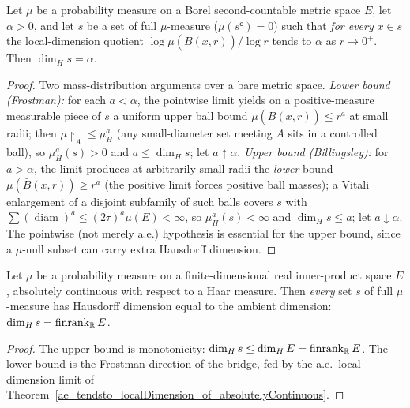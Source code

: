 \begin{theorem}\label{dimH_eq_of_localDimension_eq}
  \leanok
  Let \(\mu\) be a probability measure on a Borel second-countable metric space \(E\), let
  \(\alpha > 0\), and let \(s\) be a set of full \(\mu\)-measure (\(\mu(s^{\mathsf c}) = 0\)) such
  that \emph{for every} \(x \in s\) the local-dimension quotient
  \(\log \mu(\bar B(x,r))/\log r\) tends to \(\alpha\) as \(r \to 0^+\). Then
  \(\dim_H s = \alpha\).
\end{theorem}
\begin{proof}\leanok
  Two mass-distribution arguments over a bare metric space. \emph{Lower bound (Frostman):} for
  each \(a < \alpha\), the pointwise limit yields on a positive-measure measurable piece of \(s\)
  a uniform upper ball bound \(\mu(\bar B(x,r)) \le r^a\) at small radii; then
  \(\mu\!\restriction_A \le \mu_H^a\) (any small-diameter set meeting \(A\) sits in a controlled
  ball), so \(\mu_H^a(s) > 0\) and \(a \le \dim_H s\); let \(a \uparrow \alpha\). \emph{Upper
  bound (Billingsley):} for \(a > \alpha\), the limit produces at arbitrarily small radii the
  \emph{lower} bound \(\mu(\bar B(x,r)) \ge r^a\) (the positive limit forces positive ball
  masses); a Vitali enlargement of a disjoint subfamily of such balls covers \(s\) with
  \(\sum (\operatorname{diam})^a \le (2\tau)^a \mu(E) < \infty\), so \(\mu_H^a(s) < \infty\) and
  \(\dim_H s \le a\); let \(a \downarrow \alpha\). The pointwise (not merely a.e.) hypothesis is
  essential for the upper bound, since a \(\mu\)-null subset can carry extra Hausdorff dimension.
\end{proof}

\begin{theorem}\label{dimH_eq_finrank_of_ae_full_of_absolutelyContinuous}
  \leanok
  Let \(\mu\) be a probability measure on a finite-dimensional real inner-product space \(E\),
  absolutely continuous with respect to a Haar measure. Then \emph{every} set \(s\) of full
  \(\mu\)-measure has Hausdorff dimension equal to the ambient dimension:
  \(\dim_H s = \operatorname{finrank}_{\mathbb{R}} E\).
\end{theorem}
\begin{proof}\leanok
  The upper bound is monotonicity: \(\dim_H s \le \dim_H E = \operatorname{finrank}_{\mathbb{R}} E\). The
  lower bound is the Frostman direction of the bridge, fed by the a.e.\ local-dimension limit of
  Theorem~\ref{ae_tendsto_localDimension_of_absolutelyContinuous}.
\end{proof}

